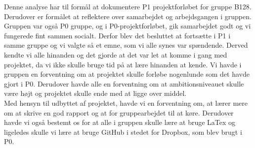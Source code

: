 Denne analyse har til formål at dokumentere P1 projektforløbet for gruppe B128. Derudover er formålet at reflektere over samarbejdet og arbejdsgangen i gruppen.
\\
Gruppen var også P0 gruppe, og i P0-projektforløbet, gik samarbejdet godt og vi fungerede fint sammen socialt. Derfor blev det besluttet at fortsætte i P1 i samme gruppe og vi valgte så et emne, som vi alle synes var spændende. Derved kendte vi alle hinanden og det gjorde at det var let at komme i gang med projektet, da vi ikke skulle bruge tid på at lære hinanden at kende. Vi havde i gruppen en forventning om at projektet skulle forløbe nogenlunde som det havde gjort i P0. Derudover havde alle en forventning om at ambitionsniveauet skulle være højt og projektet skulle ende med at ligge over middel. 
\\
Med hensyn til udbyttet af projektet, havde vi en forventning om, at lærer mere om at skrive en god rapport og at for gruppearbejdet til at køre. Derudover havde vi også bestemt os for at alle i gruppen skulle lære at bruge LaTex og ligeledes skulle vi lære at bruge GitHub i stedet for Dropbox, som blev brugt i P0.  

